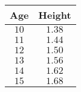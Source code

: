\begin{tabular}{cc} \toprule
Age  & Height \\\midrule
$10$ & $1.38$ \\
$11$ & $1.44$ \\
$12$ & $1.50$ \\
$13$ & $1.56$ \\
$14$ & $1.62$ \\
$15$ & $1.68$ \\\bottomrule
\end{tabular}
